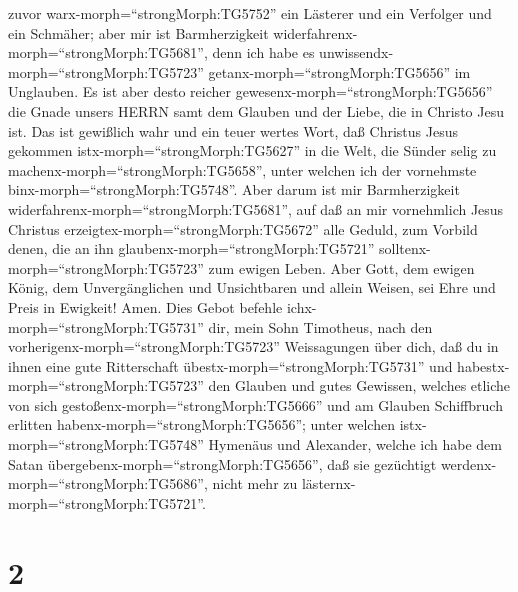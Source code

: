 zuvor warx-morph=``strongMorph:TG5752'' ein Lästerer und ein Verfolger
und ein Schmäher; aber mir ist Barmherzigkeit
widerfahrenx-morph=``strongMorph:TG5681'', denn ich habe es
unwissendx-morph=``strongMorph:TG5723''
getanx-morph=``strongMorph:TG5656'' im Unglauben.  Es ist
aber desto reicher gewesenx-morph=``strongMorph:TG5656'' die Gnade
unsers HERRN samt dem Glauben und der Liebe, die in Christo Jesu ist.
 Das ist gewißlich wahr und ein teuer wertes Wort, daß
Christus Jesus gekommen istx-morph=``strongMorph:TG5627'' in die Welt,
die Sünder selig zu machenx-morph=``strongMorph:TG5658'', unter welchen
ich der vornehmste binx-morph=``strongMorph:TG5748''.  Aber
darum ist mir Barmherzigkeit widerfahrenx-morph=``strongMorph:TG5681'',
auf daß an mir vornehmlich Jesus Christus
erzeigtex-morph=``strongMorph:TG5672'' alle Geduld, zum Vorbild denen,
die an ihn glaubenx-morph=``strongMorph:TG5721''
solltenx-morph=``strongMorph:TG5723'' zum ewigen Leben. 
Aber Gott, dem ewigen König, dem Unvergänglichen und Unsichtbaren und
allein Weisen, sei Ehre und Preis in Ewigkeit! Amen.  Dies
Gebot befehle ichx-morph=``strongMorph:TG5731'' dir, mein Sohn
Timotheus, nach den vorherigenx-morph=``strongMorph:TG5723''
Weissagungen über dich, daß du in ihnen eine gute Ritterschaft
übestx-morph=``strongMorph:TG5731''  und
habestx-morph=``strongMorph:TG5723'' den Glauben und gutes Gewissen,
welches etliche von sich gestoßenx-morph=``strongMorph:TG5666'' und am
Glauben Schiffbruch erlitten habenx-morph=``strongMorph:TG5656'';
 unter welchen istx-morph=``strongMorph:TG5748'' Hymenäus
und Alexander, welche ich habe dem Satan
übergebenx-morph=``strongMorph:TG5656'', daß sie gezüchtigt
werdenx-morph=``strongMorph:TG5686'', nicht mehr zu
lästernx-morph=``strongMorph:TG5721''.

\hypertarget{section-1}{%
\section{2}\label{section-1}}

